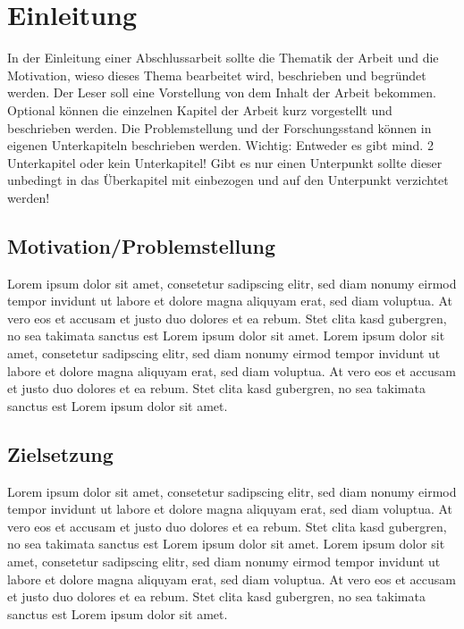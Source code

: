 \mainmatter
\chapter{Einleitung}
In der Einleitung einer Abschlussarbeit sollte die Thematik der Arbeit und die Motivation, wieso dieses Thema bearbeitet wird, beschrieben und begründet werden. Der Leser soll eine Vorstellung von dem Inhalt der Arbeit bekommen. Optional können die einzelnen Kapitel der Arbeit kurz vorgestellt und beschrieben werden. Die Problemstellung und der Forschungsstand können in eigenen Unterkapiteln beschrieben werden.
Wichtig: Entweder es gibt mind. 2 Unterkapitel oder kein Unterkapitel! Gibt es nur einen Unterpunkt sollte dieser unbedingt in das Überkapitel mit einbezogen und auf den Unterpunkt verzichtet werden!

\section{Motivation/Problemstellung}
Lorem ipsum dolor sit amet, consetetur sadipscing elitr, sed diam nonumy eirmod tempor invidunt ut labore et dolore magna aliquyam erat, sed diam voluptua. At vero eos et accusam et justo duo dolores et ea rebum. Stet clita kasd gubergren, no sea takimata sanctus est Lorem ipsum dolor sit amet. Lorem ipsum dolor sit amet, consetetur sadipscing elitr, sed diam nonumy eirmod tempor invidunt ut labore et dolore magna aliquyam erat, sed diam voluptua. At vero eos et accusam et justo duo dolores et ea rebum. Stet clita kasd gubergren, no sea takimata sanctus est Lorem ipsum dolor sit amet. 

\section{Zielsetzung}
Lorem ipsum dolor sit amet, consetetur sadipscing elitr, sed diam nonumy eirmod tempor invidunt ut labore et dolore magna aliquyam erat, sed diam voluptua. At vero eos et accusam et justo duo dolores et ea rebum. Stet clita kasd gubergren, no sea takimata sanctus est Lorem ipsum dolor sit amet. Lorem ipsum dolor sit amet, consetetur sadipscing elitr, sed diam nonumy eirmod tempor invidunt ut labore et dolore magna aliquyam erat, sed diam voluptua. At vero eos et accusam et justo duo dolores et ea rebum. Stet clita kasd gubergren, no sea takimata sanctus est Lorem ipsum dolor sit amet.

